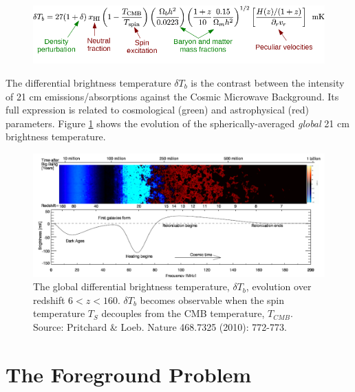 \documentclass[a0,landscape]{a0poster}
\begin{document}
\begin{multicols}{4}
\begin{figure}[H]
\centering
\includegraphics[scale=1]{figures/differential_brightness.png}
\end{figure}

The differential brightness temperature $\delta T_b$ is the contrast between the intensity of 21 cm emissions/absorptions against the Cosmic Microwave Background. Its full expression is related to cosmological (green) and astrophysical (red) parameters. Figure \ref{global} shows the evolution of the spherically-averaged \emph{global} 21 cm brightness temperature.

\begin{figure}[H]
\centering
\includegraphics[width=1.0\linewidth]{figures/global_history.png}
\caption{The global differential brightness temperature, $\delta T_b$, evolution over redshift $6<z<160$. $\delta T_b$ becomes observable when the spin temperature $T_S$ decouples from the CMB temperature, $T_{CMB}$. Source: Pritchard \& Loeb. Nature 468.7325 (2010): 772-773. }\label{global}
\end{figure}

\section*{The Foreground Problem} %


\end{multicols}
\end{document}
